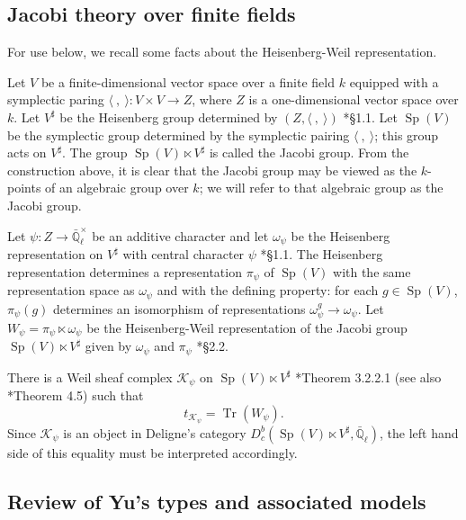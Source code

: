 \documentclass[10pt]{amsart}
\theoremstyle{plain}
\theoremstyle{definition}
\newcommand{\EE}{\mathbb{\bar Q}_\ell}
\newcommand{\Fq}{k}
\newcommand{\EEx}{\EE^\times}
\DeclareMathOperator{\trace}{Tr}
\newcommand{\trFrob}[1]{t_{#1}}
\newcommand{\cs}[1]{{\mathcal{#1}}}
\newcommand{\Sp}{{\operatorname{Sp}}}
\begin{document}
\subsection{Jacobi theory over finite fields}\label{ssec:Jacobi}

For use below, we recall some facts about the Heisenberg-Weil representation.

Let $V$ be a finite-dimensional vector space over a finite field $\Fq$ equipped with a symplectic paring $\langle\ ,\ \rangle : V\times V \to Z$, where $Z$ is a one-dimensional vector space over $\Fq$.
Let $V^\sharp$ be the Heisenberg group determined by $(Z, \langle\ ,\ \rangle)$ \cite{gurevich-hadani:07a}*{\S 1.1}.
Let $\Sp(V)$ be the symplectic group determined by the symplectic pairing $\langle\ ,\ \rangle$; this group acts on $V^\sharp$.
The group $\Sp(V)\ltimes V^\sharp$ is called the Jacobi group. 
From the construction above, it is clear that the Jacobi group may be viewed as the $\Fq$-points of an algebraic group over $\Fq$; we will refer to that algebraic group as the Jacobi group.

Let $\psi : Z \to \EEx$ be an additive character and let $\omega_\psi$ be the Heisenberg representation on $V^\sharp$ with central character $\psi$ \cite{gurevich-hadani:07a}*{\S 1.1}. 
The Heisenberg representation determines a representation $\pi_{\psi}$ of $\Sp(V)$ with the same representation space as $\omega_\psi$ and with the defining property: for each $g\in \Sp(V)$, $\pi_\psi(g)$ determines an isomorphism of representations $\omega_\psi^g \to \omega_\psi$.
Let $W_\psi = \pi_\psi \ltimes \omega_\psi$ be the Heisenberg-Weil representation of the Jacobi group $\Sp(V)\ltimes V^\sharp$ given by $\omega_\psi$ and $\pi_\psi$ \cite{gurevich-hadani:07a}*{\S 2.2}.

There is a Weil sheaf complex $\cs{K}_\psi$ on $\Sp(V)\ltimes V^\sharp$ \cite{gurevich-hadani:07a}*{Theorem 3.2.2.1} (see also \cite{gurevich-hadani:11a}*{Theorem 4.5}) such that 
\begin{equation}
\trFrob{\cs{K}_\psi} = \trace(W_\psi).
\end{equation}
%
Since $\cs{K}_\psi$ is an object in Deligne's category $D^b_c(\Sp(V)\ltimes V^\sharp,\EE)$, the left hand side of this equality must be interpreted accordingly.

\subsection{Review of Yu's types and associated models}\label{ssec:review}
\end{document}
